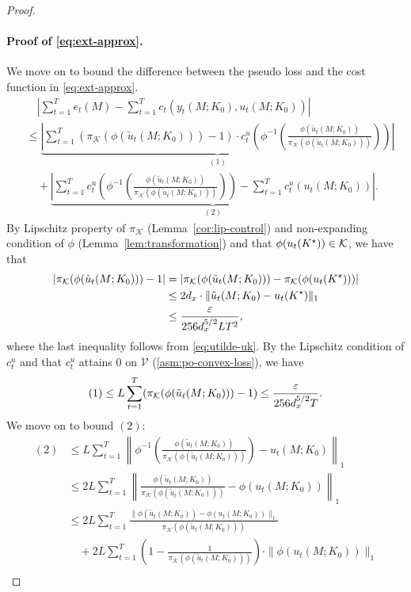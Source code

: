 \begin{proof}
\paragraph{Proof of \cref{eq:ext-approx}.} We move on to bound the difference between the pseudo loss and the cost function in \cref{eq:ext-approx}. 
\begin{align*}
& \quad \left|\sum_{t=1}^T e_t(M)-\sum_{t=1}^T c_t(y_t(M;K_0),u_t(M;K_0))\right|\\
&\le \underbrace{\left|\sum_{t=1}^T (\pi_{\mathcal{K}}(\phi(\tilde{u}_t(M;K_0)))-1) \cdot c_t^u(\phi^{-1}(\frac{\phi(\tilde{u}_t(M;K_0))}{\pi_{\mathcal{K}}(\phi(\tilde{u}_t(M;K_0)))}))\right|}_{(1)} \\
& \quad +\underbrace{\left|\sum_{t=1}^T c_t^u(\phi^{-1}(\frac{\phi(\tilde{u}_t(M;K_0))}{\pi_{\mathcal{K}}(\phi(\tilde{u}_t(M;K_0)))}))- \sum_{t=1}^T c_t^u(u_t(M;K_0))\right|}_{(2)}.
\end{align*}
By Lipschitz property of $\pi_{\mathcal{K}}$ (Lemma~\ref{cor:lip-control}) and non-expanding condition of $\phi$ (Lemma~\ref{lem:transformation}) and that $\phi(u_t(K^{\star}))\in\mathcal{K}$, we have that
\begin{align*}
|\pi_{\mathcal{K}}(\phi( \tilde{u}_t(M;K_0)))-1|&=
|\pi_{\mathcal{K}}(\phi(\tilde{u}_t(M;K_0)))-\pi_{\mathcal{K}}(\phi( u_t(K^{\star})))|\\
&\le 2d_x\cdot \|\tilde{u}_t(M;K_0)-u_t(K^{\star})\|_1\\
&\le \frac{\varepsilon }{256d_x^{5/2}LT^2},
\end{align*}
where the last inequality follows from \cref{eq:utilde-uk}. 
By the Lipschitz condition of $c_t^u$ and that $c_t^u$ attains $0$ on $\mathcal{V}$ (\cref{asm:po-convex-loss}), we have
\begin{align*}
(1)\le L \sum_{t=1}^T (\pi_{\mathcal{K}}(\phi(\tilde{u}_t(M;K_0)))-1) \le \frac{\varepsilon}{256d_x^{5/2}T}.
\end{align*}
We move on to bound $(2)$:
\begin{align*}
(2)&\le L\sum_{t=1}^T \left\|\phi^{-1}(\frac{\phi(\tilde{u}_t(M;K_0))}{\pi_{\mathcal{K}}(\phi(\tilde{u}_t(M;K_0)))})-u_t(M;K_0)\right\|_1\\
&\le 2L\sum_{t=1}^T \left\|\frac{\phi(\tilde{u}_t(M;K_0))}{\pi_{\mathcal{K}}(\phi(\tilde{u}_t(M;K_0)))}-\phi(u_t(M;K_0))\right\|_1\\
&\le 2L\sum_{t=1}^{T}  \frac{\|\phi(\tilde{u}_t(M;K_0))-\phi(u_t(M;K_0))\|_1}{\pi_{\mathcal{K}}(\phi(\tilde{u}_t(M;K_0)))} \\
&\quad + 2L\sum_{t=1}^{T}  \left(1-\frac{1}{\pi_{\mathcal{K}}(\phi(\tilde{u}_t(M;K_0)))}\right)\cdot \|\phi(u_t(M;K_0))\|_1\\

\end{align*}
\end{proof}
